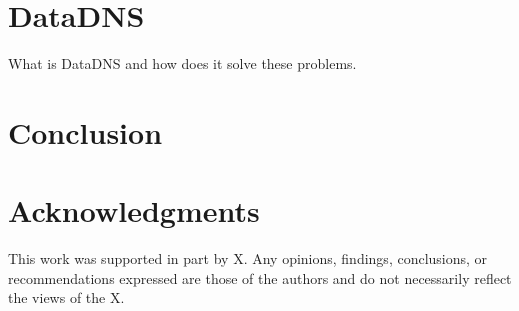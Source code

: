 \documentclass{sig-alternate}
\begin{document}
\section{DataDNS}

What is DataDNS and how does it solve these problems.

\section{Conclusion}




\section{Acknowledgments}
This work was supported in part by X. Any opinions, findings, conclusions, or recommendations expressed are those of the authors and do not necessarily reflect the views of the X.


  
\end{document}
